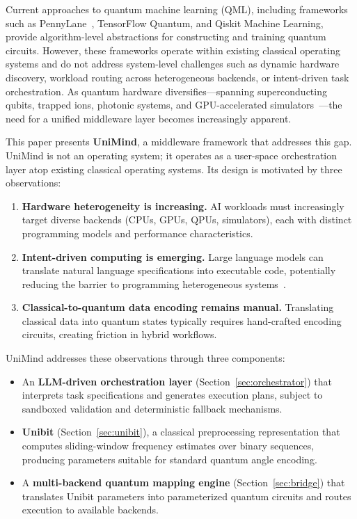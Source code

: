 ﻿\documentclass[12pt,a4paper]{article}
\begin{document}
Current approaches to quantum machine learning (QML), including frameworks such as PennyLane~\cite{bergholm2018}, TensorFlow Quantum, and Qiskit Machine Learning, provide algorithm-level abstractions for constructing and training quantum circuits. However, these frameworks operate within existing classical operating systems and do not address system-level challenges such as dynamic hardware discovery, workload routing across heterogeneous backends, or intent-driven task orchestration. As quantum hardware diversifies---spanning superconducting qubits, trapped ions, photonic systems, and GPU-accelerated simulators~\cite{microsoft2024,aws2024}---the need for a unified middleware layer becomes increasingly apparent.

This paper presents \textbf{UniMind}, a middleware framework that addresses this gap. UniMind is not an operating system; it operates as a user-space orchestration layer atop existing classical operating systems. Its design is motivated by three observations:

\begin{enumerate}[leftmargin=2em]
    \item \textbf{Hardware heterogeneity is increasing.} AI workloads must increasingly target diverse backends (CPUs, GPUs, QPUs, simulators), each with distinct programming models and performance characteristics.
    \item \textbf{Intent-driven computing is emerging.} Large language models can translate natural language specifications into executable code, potentially reducing the barrier to programming heterogeneous systems~\cite{wang2024}.
    \item \textbf{Classical-to-quantum data encoding remains manual.} Translating classical data into quantum states typically requires hand-crafted encoding circuits, creating friction in hybrid workflows.
\end{enumerate}

UniMind addresses these observations through three components:

\begin{itemize}
    \item An \textbf{LLM-driven orchestration layer} (Section~\ref{sec:orchestrator}) that interprets task specifications and generates execution plans, subject to sandboxed validation and deterministic fallback mechanisms.
    \item \textbf{Unibit} (Section~\ref{sec:unibit}), a classical preprocessing representation that computes sliding-window frequency estimates over binary sequences, producing parameters suitable for standard quantum angle encoding.
    \item A \textbf{multi-backend quantum mapping engine} (Section~\ref{sec:bridge}) that translates Unibit parameters into parameterized quantum circuits and routes execution to available backends.
\end{itemize}
\end{document}
